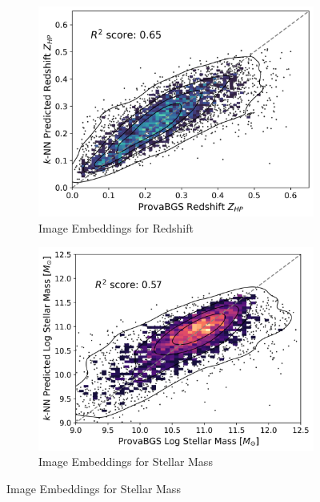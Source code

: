 \documentclass[draft, a4paper,12pt]{article}
\begin{document}
\begin{figure}[H]
    \centering
    \begin{subfigure}[b]{0.48\textwidth}
        \centering
        \includegraphics[width=\textwidth]{../figures/zeroshot_redshift_image.png}
        \caption{Image Embeddings for Redshift}
        \label{fig:redshift_image}
    \end{subfigure}%
    \hfill
    \begin{subfigure}[b]{0.48\textwidth}
        \centering
        \includegraphics[width=\textwidth]{../figures/zeroshot_stellarmass_image.png}
        \caption{Image Embeddings for Stellar Mass}
        \label{fig:stellarmass_image}
    \end{subfigure}
    

\end{figure}
\end{document}
